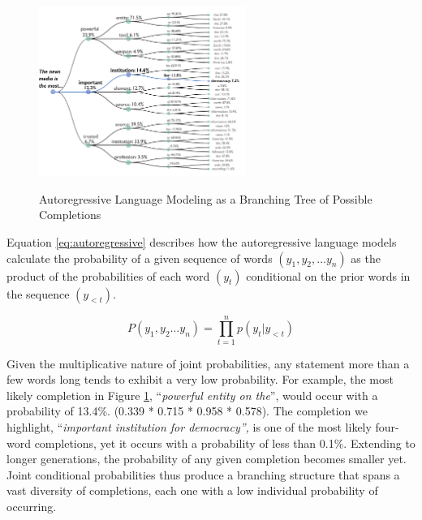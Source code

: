 \documentclass{article} %
\begin{document}
\begin{figure}
  \captionsetup{justification=raggedright,singlelinecheck=false}
  \caption{Autoregressive Language Modeling as a Branching Tree of Possible Completions}
  \centering
  \includegraphics[width=0.6\textwidth]{./figures/media/image1.png}
  \label{fig:autoregress}
\end{figure}

Equation \ref{eq:autoregressive} describes how the autoregressive language models calculate the probability of a given sequence of words $(y_1, y_2, \ldots y_n)$ as the product of the probabilities of each word $(y_t)$ conditional on the prior words in the sequence $(y_{<t})$.

\begin{equation}
  P(y_1, y_2\dots y_n) = \prod_{t = 1}^{n}p(y_t|y_{<t})
  \label{eq:autoregressive}
\end{equation}

Given the multiplicative nature of joint probabilities, any statement
more than a few words long tends to exhibit a very low probability.
For example, the most likely completion in Figure \ref{fig:autoregress},
``\emph{powerful entity on the}'', would occur with a probability of 13.4\%.
(0.339 * 0.715 * 0.958 * 0.578). The completion we highlight, ``\emph{important
institution for democracy'',} is one of the most likely four-word completions,
yet it occurs with a probability of less than 0.1\%. Extending to longer
generations, the probability of any given completion becomes smaller yet.
Joint conditional probabilities thus produce a branching structure that spans
a vast diversity of completions, each one with a low individual probability of
occurring.
\end{document}
